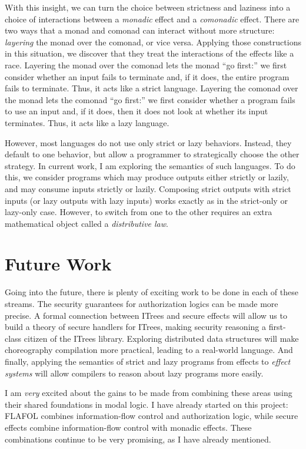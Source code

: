 \documentclass{article}
\theoremstyle{definition}
\begin{document}
With this insight, we can turn the choice between strictness and laziness into a choice of interactions between a \emph{monadic} effect and a \emph{comonadic} effect.
There are two ways that a monad and comonad can interact without more structure: \emph{layering} the monad over the comonad, or vice versa.
Applying those constructions in this situation, we discover that they treat the interactions of the effects like a race.
Layering the monad over the comonad lets the monad ``go first:'' we first consider whether an input fails to terminate and, if it does, the entire program fails to terminate.
Thus, it acts like a strict language.
Layering the comonad over the monad lets the comonad ``go first:'' we first consider whether a program fails to use an input and, if it does, then it does not look at whether its input terminates.
Thus, it acts like a lazy language.

However, most languages do not use only strict or lazy behaviors.
Instead, they default to one behavior, but allow a programmer to strategically choose the other strategy.
In current work, I am exploring the semantics of such languages.
To do this, we consider programs which may produce outputs either strictly or lazily, and may consume inputs strictly or lazily.
Composing strict outputs with strict inputs (or lazy outputs with lazy inputs) works exactly as in the strict-only or lazy-only case.
However, to switch from one to the other requires an extra mathematical object called a \emph{distributive law}.

\section*{Future Work}

Going into the future, there is plenty of exciting work to be done in each of these streams.
The security guarantees for authorization logics can be made more precise.
A formal connection between ITrees and secure effects will allow us to build a theory of secure handlers for ITrees, making security reasoning a first-class citizen of the ITrees library.
Exploring distributed data structures will make choreography compilation more practical, leading to a real-world language.
And finally, applying the semantics of strict and lazy programs from effects to \emph{effect systems} will allow compilers to reason about lazy programs more easily.

I am \emph{very} excited about the gains to be made from combining these areas using their shared foundations in modal logic.
I have already started on this project: FLAFOL combines information-flow control and authorization logic, while secure effects combine information-flow control with monadic effects.
These combinations continue to be very promising, as I have already mentioned.
\end{document}
